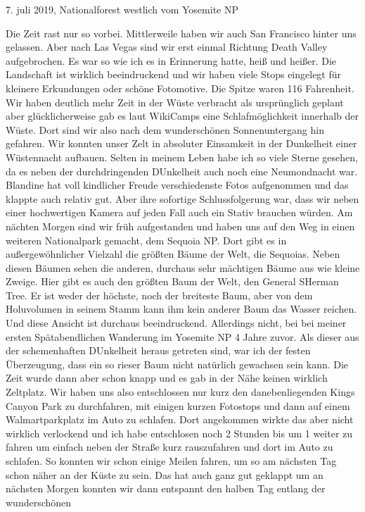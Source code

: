 \documentclass[11pt]{book}
\begin{document}
7. juli 2019, Nationalforest westlich vom Yosemite NP 

Die Zeit rast nur so vorbei. Mittlerweile haben wir auch San Francisco hinter uns gelassen. Aber nach Las Vegas sind wir erst einmal Richtung Death 
Valley aufgebrochen. Es war so wie ich es in Erinnerung hatte, heiß und heißer. Die Landschaft ist wirklich beeindruckend und wir haben viele Stops 
eingelegt für kleinere Erkundungen oder schöne Fotomotive. Die Spitze waren 116 Fahrenheit. Wir haben deutlich mehr Zeit in der Wüste verbracht als 
ursprünglich geplant aber glücklicherweise gab es laut WikiCamps eine Schlafmöglichkeit innerhalb der Wüste. Dort sind wir also nach dem wunderschönen 
Sonnenuntergang hin gefahren. Wir konnten unser Zelt in absoluter Einsamkeit in der Dunkelheit einer Wüstennacht aufbauen. Selten in meinem Leben habe ich so viele 
Sterne gesehen, da es neben der durchdringenden DUnkelheit auch noch eine Neumondnacht war. Blandine hat voll kindlicher Freude verschiedenste Fotos 
aufgenommen und das klappte auch relativ gut. Aber ihre sofortige Schlussfolgerung war, dass wir neben einer hochwertigen Kamera auf jeden Fall auch 
ein Stativ brauchen würden. Am nächten Morgen sind wir früh aufgestanden und haben uns auf den Weg in einen weiteren Nationalpark gemacht, dem Sequoia 
NP. Dort gibt es in außergewöhnlicher Vielzahl die größten Bäume der Welt, die Sequoias. Neben diesen Bäumen sehen die anderen, durchaus sehr mächtigen 
Bäume aus wie kleine Zweige. Hier gibt es auch den größten Baum der Welt, den General SHerman Tree. Er ist weder der höchste, noch der breiteste Baum, 
aber von dem Holuvolumen in seinem Stamm kann ihm kein anderer Baum das Wasser reichen. Und diese Ansicht ist durchaus beeindruckend. Allerdings nicht, 
bei bei meiner ersten Spätabendlichen Wanderung im Yosemite NP 4 Jahre zuvor. Als dieser aus der schemenhaften DUnkelheit heraus getreten sind, war ich 
der festen Überzeugung, dass ein so rieser Baum nicht natürlich gewachsen sein kann. Die Zeit wurde dann aber schon knapp und es gab in der Nähe keinen 
wirklich Zeltplatz. Wir haben uns also entschlossen nur kurz den danebenliegenden Kings Canyon Park zu durchfahren, mit einigen kurzen Fotostops und dann 
auf einem Walmartparkplatz im Auto zu schlafen. Dort angekommen wirkte das aber nicht wirklich verlockend und ich habe entschlosen noch 2 Stunden bis um 1 
weiter zu fahren um einfach neben der Straße kurz rauszufahren und dort im Auto zu schlafen. So konnten wir schon einige Meilen fahren, um so am nächsten 
Tag schon näher an der Küste zu sein. Das hat auch ganz gut geklappt um an nächsten Morgen konnten wir dann entspannt den halben Tag entlang der wunderschönen 
\end{document}
